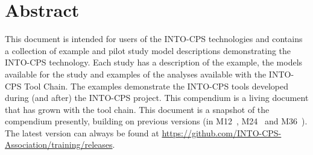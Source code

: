\documentclass[narrowmargin,12pt,a4paper,final]{include/intocpsassociation}   %
\begin{document}
\maketitle

\section*{Abstract}
\label{sec:abstract}

This document is intended for users of the INTO-CPS technologies and contains a collection of example and pilot study model descriptions demonstrating the INTO-CPS technology. Each study has a description of the example, the models available for the study and examples of the analyses available with the INTO-CPS Tool Chain. The examples demonstrate the INTO-CPS tools developed during (and after) the INTO-CPS project. This compendium is a living document that has grown with the tool chain. This document is a snapshot of the compendium presently, building on previous versions (in M12~\cite{INTOCPSD3.4}, M24~\cite{INTOCPSD3.5} and M36~\cite{INTOCPSD3.6}). The latest version can always be found at \url{https://github.com/INTO-CPS-Association/training/releases}.

\newpage

\tableofcontents
\newpage


\clearpage

\clearpage

\clearpage

\clearpage

\clearpage

\clearpage

\clearpage

\clearpage

\clearpage

\clearpage

\clearpage

\newpage

 
\label{ch:bib} %
\end{document}
